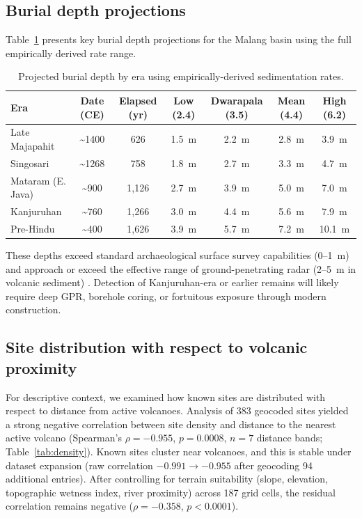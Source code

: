\documentclass[12pt,a4paper]{article}
\begin{document}
\subsection{Burial depth projections}

Table~\ref{tab:depth} presents key burial depth projections for the Malang basin using the full empirically derived rate range.

\begin{table}[t]
\caption{Projected burial depth by era using empirically-derived sedimentation rates.}
\label{tab:depth}
\begin{tabular}{lcccccc}
\toprule
Era & Date (CE) & Elapsed (yr) & Low (2.4) & Dwarapala (3.5) & Mean (4.4) & High (6.2) \\
\midrule
Late Majapahit & \textasciitilde1400 & 626 & 1.5~m & 2.2~m & 2.8~m & 3.9~m \\
Singosari & \textasciitilde1268 & 758 & 1.8~m & 2.7~m & 3.3~m & 4.7~m \\
Mataram (E. Java) & \textasciitilde900 & 1,126 & 2.7~m & 3.9~m & 5.0~m & 7.0~m \\
Kanjuruhan & \textasciitilde760 & 1,266 & 3.0~m & 4.4~m & 5.6~m & 7.9~m \\
Pre-Hindu & \textasciitilde400 & 1,626 & 3.9~m & 5.7~m & 7.2~m & 10.1~m \\
\bottomrule
\end{tabular}
\end{table}

These depths exceed standard archaeological surface survey capabilities (0--1~m) and approach or exceed the effective range of ground-penetrating radar (2--5~m in volcanic sediment) \citep{conyers2004,goodman2013}. Detection of Kanjuruhan-era or earlier remains will likely require deep GPR, borehole coring, or fortuitous exposure through modern construction.

\subsection{Site distribution with respect to volcanic proximity}

For descriptive context, we examined how known sites are distributed with respect to distance from active volcanoes. Analysis of 383 geocoded sites yielded a strong negative correlation between site density and distance to the nearest active volcano (Spearman's $\rho = -0.955$, $p = 0.0008$, $n = 7$ distance bands; Table~\ref{tab:density}). Known sites cluster near volcanoes, and this is stable under dataset expansion (raw correlation $-0.991 \to -0.955$ after geocoding 94 additional entries). After controlling for terrain suitability (slope, elevation, topographic wetness index, river proximity) across 187 grid cells, the residual correlation remains negative ($\rho = -0.358$, $p < 0.0001$).
\end{document}
